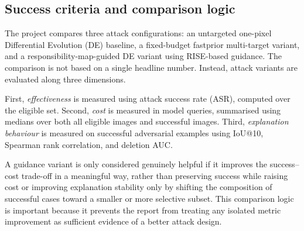 \subsection{Success criteria and comparison logic}
The project compares three attack configurations: an untargeted one-pixel Differential Evolution (DE) baseline, a fixed-budget fastprior multi-target variant, and a responsibility-map-guided DE variant using RISE-based guidance.
The comparison is not based on a single headline number.
Instead, attack variants are evaluated along three dimensions.

First, \emph{effectiveness} is measured using attack success rate (ASR), computed over the eligible set.
Second, \emph{cost} is measured in model queries, summarised using medians over both all eligible images and successful images.
Third, \emph{explanation behaviour} is measured on successful adversarial examples using IoU@10, Spearman rank correlation, and deletion AUC.

A guidance variant is only considered genuinely helpful if it improves the success--cost trade-off in a meaningful way, rather than preserving success while raising cost or improving explanation stability only by shifting the composition of successful cases toward a smaller or more selective subset.
This comparison logic is important because it prevents the report from treating any isolated metric improvement as sufficient evidence of a better attack design.
